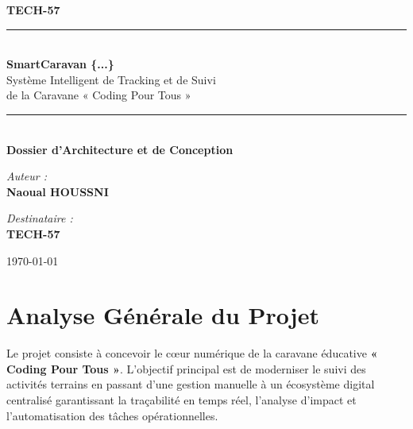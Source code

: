 \documentclass[12pt,a4paper]{article}
\begin{document}
\begin{titlepage}
    \centering
    \vspace*{2cm}
    
    {\Large \textbf{TECH-57}} \\[1cm]
    
    
    \rule{\linewidth}{0.5mm} \\[0.5cm]
    {\Huge \textbf{\color{techblue} SmartCaravan \{...\}}} \\[0.5cm]
    {\Large Système Intelligent de Tracking et de Suivi\\[0.2cm] de la Caravane « Coding Pour Tous »} \\[0.4cm]
    \rule{\linewidth}{0.5mm} \\[1.5cm]
    
    {\large \textbf{Dossier d'Architecture et de Conception}} \\[2cm]
    
    \vfill
    
    \begin{minipage}{0.4\textwidth}
        \begin{flushleft} \large
            \emph{Auteur :}\\
            \textbf{Naoual HOUSSNI}
        \end{flushleft}
    \end{minipage}
    \hfill
    \begin{minipage}{0.4\textwidth}
        \begin{flushright} \large
            \emph{Destinataire :}\\
            \textbf{TECH-57}
        \end{flushright}
    \end{minipage}
    
    \vspace{2cm}
    {\large \today}
    
\end{titlepage}

\tableofcontents
\newpage


\section{Analyse Générale du Projet}
Le projet consiste à concevoir le cœur numérique de la caravane éducative \textbf{« Coding Pour Tous »}. L'objectif principal est de moderniser le suivi des activités terrains en passant d'une gestion manuelle à un écosystème digital centralisé garantissant la traçabilité en temps réel, l'analyse d'impact et l'automatisation des tâches opérationnelles.
\end{document}
